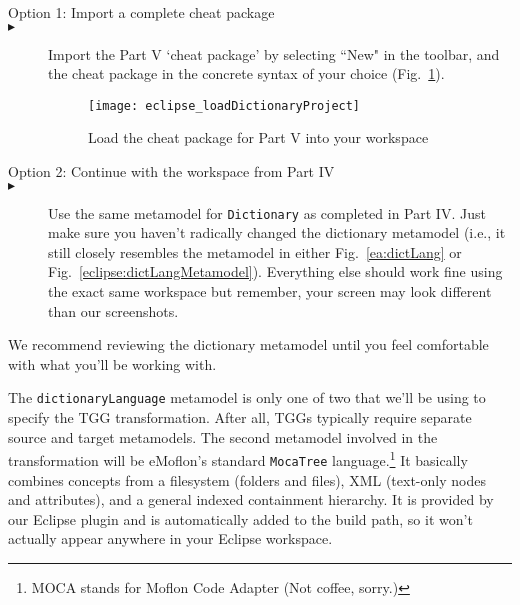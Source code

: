 \vspace{0.5cm}

\begin{description}

\item[Option 1: Import a complete cheat package]

\item[$\blacktriangleright$] \hspace{0.3cm} Import the Part V `cheat package' by selecting ``New" in the toolbar, and the cheat package in the concrete syntax
of your choice (Fig.~\ref{eclipse_cheatPackage}).

\begin{figure}[htbp]
\begin{center}
  \texttt{[image: eclipse\_loadDictionaryProject]}
  \caption{Load the cheat package for Part V into your workspace}
  \label{eclipse_cheatPackage}
\end{center}
\end{figure}

\vspace{0.5cm}

\item[Option 2: Continue with the workspace from Part IV]


\item[$\blacktriangleright$] \hspace{0.3cm} Use the same metamodel for \texttt{Dictionary} as completed in Part IV. Just make sure you haven't radically changed
the dictionary metamodel (i.e., it still closely resembles the metamodel in either Fig.~\ref{ea:dictLang} or Fig.~\ref{eclipse:dictLangMetamodel}). Everything
else should work fine using the exact same workspace but remember, your screen may look different than our screenshots.

\end{description}


We recommend reviewing the dictionary metamodel until you feel comfortable with what you'll be working with. 

\newpage

The \texttt{dictionaryLanguage} metamodel is only one of two that we'll be using to specify the TGG transformation. After all, TGGs typically require separate
source and target metamodels. The second metamodel involved in the transformation will be eMoflon's standard \texttt{MocaTree} language.\footnote{MOCA stands
for Moflon Code Adapter (Not coffee, sorry.)} It basically combines concepts from a filesystem (folders and files), XML (text-only nodes and attributes), and a
general indexed containment hierarchy. It is provided by our Eclipse plugin and is automatically added to the build path, so it won't actually appear
anywhere in your Eclipse workspace.

